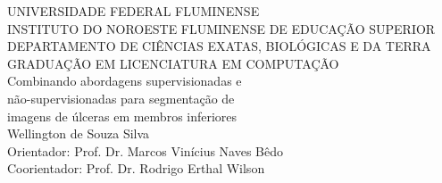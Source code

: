 \begin{center}
    {\large UNIVERSIDADE FEDERAL FLUMINENSE} \\[0.2cm]
    {\large INSTITUTO DO NOROESTE FLUMINENSE DE EDUCAÇÃO SUPERIOR} \\[0.2cm]
    {\large DEPARTAMENTO DE CIÊNCIAS EXATAS, BIOLÓGICAS E DA TERRA} \\[0.2cm]
    {\large GRADUAÇÃO EM LICENCIATURA EM COMPUTAÇÃO} \\[7cm]
    
    {\huge Combinando abordagens supervisionadas e} \\[0.25cm]
    {\huge  não-supervisionadas para segmentação de} \\[0.25cm]
    {\huge imagens de úlceras em membros inferiores} \\[9cm]

    {\large Wellington de Souza Silva} \\[0.2cm]
    {\large Orientador: Prof. Dr. Marcos Vinícius Naves Bêdo} \\[0.2cm]
    {\large Coorientador: Prof. Dr. Rodrigo Erthal Wilson} \\[0.2cm]
\end{center}
